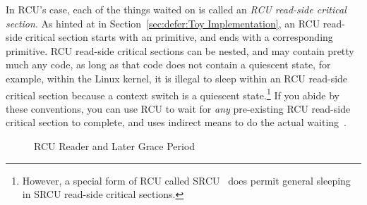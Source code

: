 In RCU's case, each of the things waited on is called an
\emph{RCU read-side critical section}.
As hinted at in
Section~\ref{sec:defer:Toy Implementation}, an RCU read-side critical
section starts with an  primitive, and ends with a
corresponding  primitive.
RCU read-side critical sections can be nested, and may contain pretty
much any code, as long as that code does not contain a quiescent state,
for example, within the Linux kernel, it is illegal to sleep within
an RCU read-side critical section because a context switch is a quiescent
state.\footnote{
	However, a special form of RCU called SRCU~\cite{PaulEMcKenney2006c}
	does permit general sleeping in SRCU read-side critical sections.}
If you abide by these conventions, you can use RCU to wait for \emph{any}
pre-existing RCU read-side critical section to complete, and
 uses indirect means to do the actual
waiting~\cite{MathieuDesnoyers2012URCU,McKenney:2013:SDS:2483852.2483867}.

\begin{figure}[tbp]
\centering
{}
\caption{RCU Reader and Later Grace Period}
\label{fig:defer:RCU Reader and Later Grace Period}
\end{figure}

